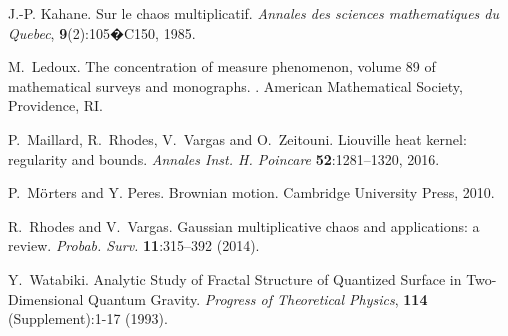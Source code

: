 \documentclass[11pt]{article}
\theoremstyle{definition}
\begin{document}
\begin{thebibliography}{10}
J.-P. Kahane.
\newblock Sur le chaos multiplicatif.
\newblock \textit{Annales des sciences mathematiques du Quebec}, {\bf 9}(2):105�C150, 1985.


M.~Ledoux.
\newblock The concentration of measure phenomenon, volume 89 of mathematical
  surveys and monographs.
.
\newblock American Mathematical Society, Providence, RI.



P.~Maillard, R.~Rhodes, V.~Vargas and O.~Zeitouni.
\newblock Liouville heat kernel: regularity and bounds.
\newblock \textit{Annales Inst. H. Poincare} {\bf 52}:1281--1320, 2016.


P.~M$\ddot{\rm o}$rters and Y. Peres.
\newblock Brownian motion.
\newblock Cambridge University Press, 2010.

  R.~Rhodes and V.~Vargas.
  \newblock
  Gaussian multiplicative chaos and applications: a review.
  \newblock \textit{Probab. Surv.} {\bf   11}:315--392  (2014).

Y.~Watabiki.
\newblock
Analytic Study of Fractal Structure of Quantized Surface in
Two-Dimensional Quantum Gravity.
\newblock \textit{Progress of Theoretical Physics}, {\bf  114}
(Supplement):1-17 (1993).
\end{thebibliography}
\end{document}
